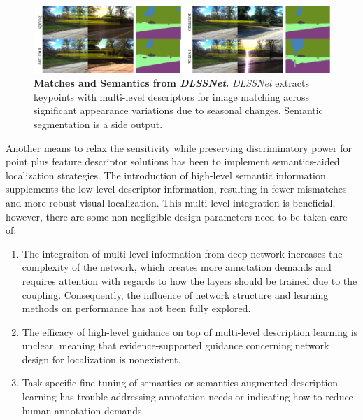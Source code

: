 \begin{figure}[t] 
 	\centering
  	\includegraphics[width=0.8\linewidth]{figures/learning/intro.pdf}
    \caption[Matches and Semantics from {\em DLSSNet}]{\textbf{Matches and Semantics from {\em DLSSNet}.} {\em DLSSNet} extracts keypoints with multi-level descriptors for image matching across significant appearance variations due to seasonal changes. Semantic segmentation is a side output.
    \label{fig:learning_intro}}
\end{figure}

Another means to relax the sensitivity while preserving discriminatory power for point plus feature descriptor solutions has been to implement semantics-aided localization strategies.  
The introduction of high-level semantic information supplements the low-level descriptor information, resulting in fewer mismatches and more robust visual localization. 
This multi-level integration is beneficial, however, there are some non-negligible design parameters need to be taken care of:
\begin{enumerate}
	\item The integraiton of multi-level information from deep network increases the complexity of the network, which creates more annotation demands and requires attention with regards to how the layers should be trained due to the coupling.
Consequently, the influence of network structure and learning methods on performance has not been fully explored.  
	\item The efficacy of high-level guidance on top of multi-level description learning is unclear, meaning that evidence-supported guidance concerning network design for localization is nonexistent.  
	\item Task-specific fine-tuning of semantics or semantics-augmented description learning has trouble addressing annotation needs or indicating how to reduce human-annotation demands. 
\end{enumerate}


